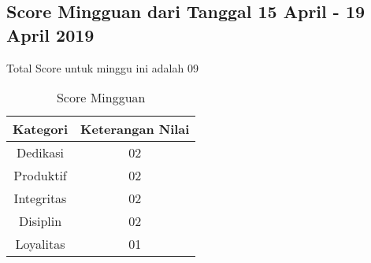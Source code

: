 \subsection{Score Mingguan dari Tanggal 15 April - 19 April 2019}
Total Score untuk minggu ini adalah 09

\begin{table}[h]
\caption{Score Mingguan}
\centering
\begin{tabular}{|c|c|}
\hline
\textbf{Kategori}&\textbf{Keterangan Nilai}\\
\hline
Dedikasi&02\\
\hline
Produktif&02\\
\hline
Integritas&02\\
\hline
Disiplin&02\\
\hline
Loyalitas&01\\
\hline
\end{tabular}
\label{table:score mingguan}
\end{table}